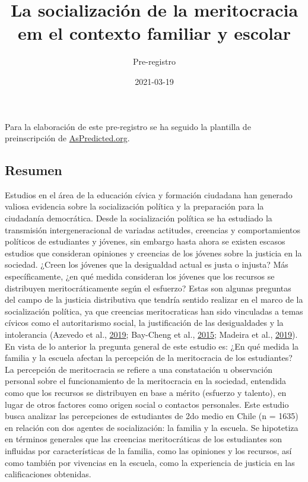 \documentclass[
  12pt,
]{article}
\title{La socialización de la meritocracia em el contexto familiar y escolar}
\subtitle{Pre-registro}
\author{}
\date{\vspace{-2.5em}2021-03-19}
\begin{document}
\maketitle

Para la elaboración de este pre-registro se ha seguido la plantilla de
preinscripción de \href{https://aspredicted.org/}{AsPredicted.org}.

\hypertarget{resumen}{%
\subsection{Resumen}\label{resumen}}

Estudios en el área de la educación cívica y formación ciudadana han
generado valiosa evidencia sobre la socialización política y la
preparación para la ciudadanía democrática. Desde la socialización
política se ha estudiado la transmisión intergeneracional de variadas
actitudes, creencias y comportamientos políticos de estudiantes y
jóvenes, sin embargo hasta ahora se existen escasos estudios que
consideran opiniones y creencias de los jóvenes sobre la justicia en la
sociedad. ¿Creen los jóvenes que la desigualdad actual es justa o
injusta? Más específicamente, ¿en qué medida consideran los jóvenes que
los recursos se distribuyen meritocráticamente según el esfuerzo? Estas
son algunas preguntas del campo de la justicia distributiva que tendría
sentido realizar en el marco de la socialización política, ya que
creencias meritocraticas han sido vinculadas a temas cívicos como el
autoritarismo social, la justificación de las desigualdades y la
intolerancia (Azevedo et al.,
\protect\hyperlink{ref-azevedo_Neoliberal_2019}{2019}; Bay-Cheng et al.,
\protect\hyperlink{ref-bay-cheng_Tracking_2015a}{2015}; Madeira et al.,
\protect\hyperlink{ref-madeira_Primes_2019}{2019}). En vista de lo
anterior la pregunta general de este estudio es: ¿En qué medida la
familia y la escuela afectan la percepción de la meritocracia de los
estudiantes? La percepción de meritocracia se refiere a una constatación
u observación personal sobre el funcionamiento de la meritocracia en la
sociedad, entendida como que los recursos se distribuyen en base a
mérito (esfuerzo y talento), en lugar de otros factores como origen
social o contactos personales. Este estudio busca analizar las
percepciones de estudiantes de 2do medio en Chile (n = 1635) en relación
con dos agentes de socialización: la familia y la escuela. Se hipotetiza
en términos generales que las creencias meritocráticas de los
estudiantes son influidas por características de la familia, como las
opiniones y los recursos, así como también por vivencias en la escuela,
como la experiencia de justicia en las calificaciones obtenidas.
\end{document}
